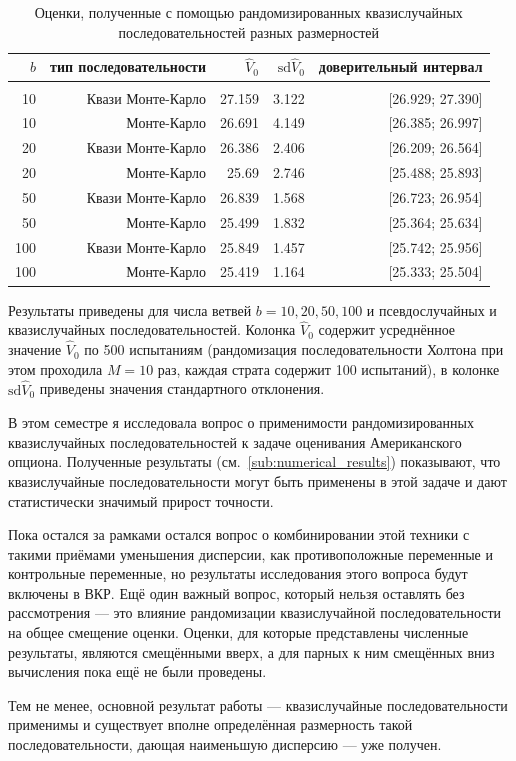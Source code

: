 \documentclass[specialist,
               substylefile = ../spbu.rtx,
               subf,href,colorlinks=true, 12pt]{disser}
\newcommand{\Vhat}{\hat{V}}
\begin{document}
\begin{table}
	\renewcommand{\arraystretch}{0.6}
	\centering
	\caption{Оценки, полученные с помощью рандомизированных квазислучайных последовательностей разных размерностей}
	\begin{tabular}{rrrrr}
		$b$&тип последовательности&$\Vhat_0$&$\mathrm{sd}\Vhat_0$&доверительный интервал\\[5pt]\hline\\
		10&Квази Монте-Карло&27.159&3.122&[26.929; 27.390]\\
		10&Монте-Карло&26.691&4.149&[26.385; 26.997]\\[5pt]
		20&Квази Монте-Карло&26.386&2.406&[26.209; 26.564]\\
		20&Монте-Карло&25.69&2.746&[25.488; 25.893]\\[5pt]
		50&Квази Монте-Карло&26.839&1.568&[26.723; 26.954]\\
		50&Монте-Карло&25.499&1.832&[25.364; 25.634]\\[5pt]
		100&Квази Монте-Карло&25.849&1.457&[25.742; 25.956]\\
		100&Монте-Карло&25.419&1.164&[25.333; 25.504]\\[10pt]
	\end{tabular}
	\label{tbl:quasi_vs_common_mc}

	\footnotesize
	Результаты приведены для числа ветвей $b = 10, 20, 50, 100$ и псевдослучайных и квазислучайных последовательностей. Колонка $\Vhat_0$ содержит усреднённое значение $\Vhat_0$ по 500 испытаниям (рандомизация последовательности Холтона при этом проходила $M = 10$ раз, каждая страта содержит 100 испытаний), в колонке $\mathrm{sd}\Vhat_0$ приведены значения стандартного отклонения.
\end{table}




\conclusion

В этом семестре я исследовала вопрос о применимости рандомизированных квазислучайных последовательностей к задаче оценивания Американского опциона. Полученные результаты (см.~\ref{sub:numerical_results}) показывают, что квазислучайные последовательности могут быть применены в этой задаче и дают статистически значимый прирост точности. 

Пока остался за рамками остался вопрос о комбинировании этой техники с такими приёмами уменьшения дисперсии, как противоположные переменные и контрольные переменные, но результаты исследования этого вопроса будут включены в ВКР. Ещё один важный вопрос, который нельзя оставлять без рассмотрения --- это влияние рандомизации квазислучайной последовательности на общее смещение оценки. Оценки, для которые представлены численные результаты, являются смещёнными вверх, а для парных к ним смещённых вниз вычисления пока ещё не были проведены.

Тем не менее, основной результат работы --- квазислучайные последовательности применимы и существует вполне определённая размерность такой последовательности, дающая наименьшую дисперсию --- уже получен.

\printbibliography[heading=bibintoc]
\end{document}
